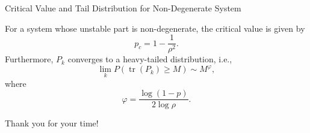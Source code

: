 \documentclass[10pt]{beamer}
\DeclareMathOperator{\tr}{tr}
\begin{document}
  \begin{frame}{Critical Value and Tail Distribution for Non-Degenerate System}
    \begin{theorem}
      For a system whose unstable part is non-degenerate, the critical value is given by
      \begin{displaymath}
	p_c = 1-\frac{1}{\rho^2}.
      \end{displaymath}
      Furthermore, $P_k$ converges to a heavy-tailed distribution, i.e.,
      \begin{displaymath}
	\lim_k P(\tr(P_k)\geq M) \sim M^\varphi,
      \end{displaymath}
      where 
      \begin{displaymath}
	\varphi = \frac{\log(1-p)}{2\log \rho}.	
      \end{displaymath}
    \end{theorem}
  \end{frame}

\begin{frame}[standout]
 Thank you for your time! 
\end{frame}
\end{document}
